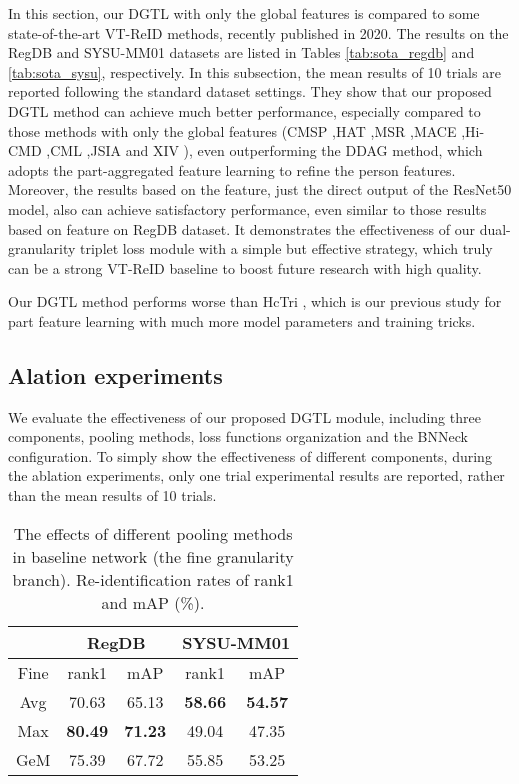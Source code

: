 \documentclass[journal]{IEEEtran}
\begin{document}
In this section, our DGTL with only the global features is compared to some state-of-the-art VT-ReID methods, recently published in 2020. The results on the RegDB and SYSU-MM01 datasets are listed in Tables \ref{tab:sota_regdb} and \ref{tab:sota_sysu}, respectively. In this subsection, the mean results of 10 trials are reported following the standard dataset settings.
They show that our proposed DGTL method can achieve much better performance, especially compared to those methods with only the global features (CMSP \cite{wu2020rgb},HAT \cite{ye2020vipr},MSR \cite{Feng2020LearningMR},MACE \cite{Ye2020CrossModalityPR},Hi-CMD \cite{choi2020hi},CML \cite{Ling2020ClassAwareMM},JSIA \cite{Wang2020CrossModalityPG} and XIV \cite{Li2020InfraredVisibleCP}), even outperforming the DDAG \cite{ye2020dynamic} method, which adopts the part-aggregated feature learning to refine the person features.
Moreover, the results based on the  feature, just the direct output of the ResNet50 model, also can achieve satisfactory performance, even similar to those results based on  feature on RegDB dataset. It demonstrates the effectiveness of our dual-granularity triplet loss module with a simple but effective strategy, which truly can be a strong VT-ReID baseline to  boost future research with high quality.

Our DGTL method performs worse than HcTri \cite{Liu2020ParametersSE}, which is our previous study for part feature learning with much more model parameters and training tricks.

\subsection{Alation experiments}
We evaluate the effectiveness of our proposed DGTL module, including three components, pooling methods, loss functions organization and the BNNeck configuration. To simply show the effectiveness of different components, during the ablation experiments, only one trial experimental results are reported, rather than the mean results of 10 trials.


\begin{table}
\scriptsize
\caption{The effects of different pooling methods in baseline network (the fine granularity branch). Re-identification rates of rank1 and mAP (\%).}
\label{tab:ablation_fine_pool}
  \centering
  \setlength{\tabcolsep}{0.5cm}
  \begin{tabular}{c|c|c|c|c}
   \toprule[2pt]
     & \multicolumn{2}{c|}{RegDB} & \multicolumn{2}{c}{SYSU-MM01}\\ \hline
    Fine & rank1 & mAP  & rank1 & mAP  \\ \toprule[1pt]
    Avg & 70.63 & 65.13 & \textbf{58.66} & \textbf{54.57} \\
    Max & \textbf{80.49} & \textbf{71.23} & 49.04 & 47.35  \\
    GeM & 75.39 & 67.72 & 55.85 & 53.25  \\
     \toprule[2pt]
  \end{tabular}
\end{table}
\end{document}

